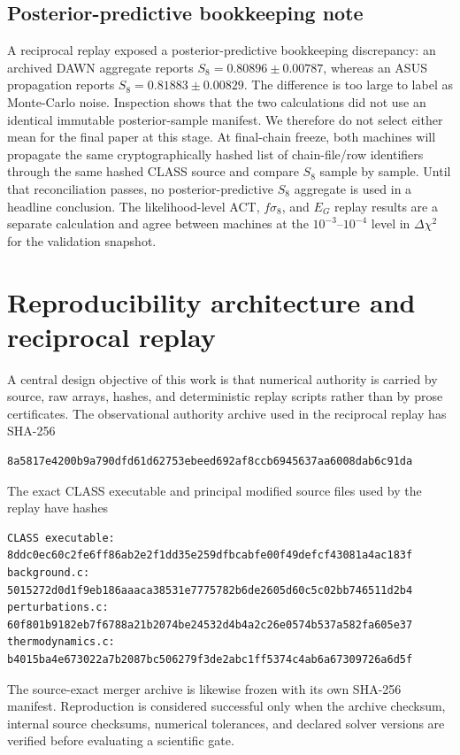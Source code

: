 \documentclass[12pt]{iopart}
\begin{document}
\subsection{Posterior-predictive bookkeeping note}

A reciprocal replay exposed a posterior-predictive bookkeeping discrepancy: an archived DAWN aggregate reports $S_8=0.80896\pm0.00787$, whereas an ASUS propagation reports $S_8=0.81883\pm0.00829$.  The difference is too large to label as Monte-Carlo noise.  Inspection shows that the two calculations did not use an identical immutable posterior-sample manifest.  We therefore do not select either mean for the final paper at this stage.  At final-chain freeze, both machines will propagate the same cryptographically hashed list of chain-file/row identifiers through the same hashed CLASS source and compare $S_8$ sample by sample.  Until that reconciliation passes, no posterior-predictive $S_8$ aggregate is used in a headline conclusion.  The likelihood-level ACT, $f\sigma_8$, and $E_G$ replay results are a separate calculation and agree between machines at the $10^{-3}$--$10^{-4}$ level in $\Delta\chi^2$ for the validation snapshot.

\section{Reproducibility architecture and reciprocal replay}
\label{sec:repro}

A central design objective of this work is that numerical authority is carried by source, raw arrays, hashes, and deterministic replay scripts rather than by prose certificates.  The observational authority archive used in the reciprocal replay has SHA-256
\begin{verbatim}
8a5817e4200b9a790dfd61d62753ebeed692af8ccb6945637aa6008dab6c91da
\end{verbatim}
The exact CLASS executable and principal modified source files used by the replay have hashes
\begin{verbatim}
CLASS executable:
8ddc0ec60c2fe6ff86ab2e2f1dd35e259dfbcabfe00f49defcf43081a4ac183f
background.c:
5015272d0d1f9eb186aaaca38531e7775782b6de2605d60c5c02bb746511d2b4
perturbations.c:
60f801b9182eb7f6788a21b2074be24532d4b4a2c26e0574b537a582fa605e37
thermodynamics.c:
b4015ba4e673022a7b2087bc506279f3de2abc1ff5374c4ab6a67309726a6d5f
\end{verbatim}
The source-exact merger archive is likewise frozen with its own SHA-256 manifest.  Reproduction is considered successful only when the archive checksum, internal source checksums, numerical tolerances, and declared solver versions are verified before evaluating a scientific gate.
\end{document}
